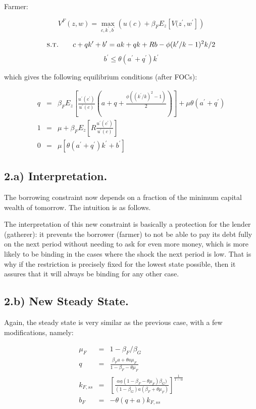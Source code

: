 \documentclass{article}
\begin{document}
Farmer:

$$ V^F(z,w) = \max_{c,k^{\prime},b^{\prime} } \left( u(c) + \beta_F E_z \left[ V(z^{\prime},w^{\prime} \right]  \right) $$

$$ \textsc{s.t.} \quad \quad c+qk^\prime+b^\prime = ak + qk +Rb - \phi(k^\prime/k - 1)^2k/2$$
$$b^\prime \leq \theta \left( a^\prime + q^\prime \right)k^\prime $$

which gives the following equilibrium conditions (after FOCs):

\begin{eqnarray*}
 q & = & \beta_F E_z\left[ \frac{u^\prime(c^\prime)}{u^\prime(c)}(a+q+\frac{\phi((k^\prime/k)^2 -1)}{2})\right]+\mu \theta (a^\prime + q^\prime)\\
 1 & = & \mu + \beta_F E_z\left[R\frac{u^\prime(c^\prime)}{u^\prime(c)}\right] \\
 0 & = & \mu \left[\theta (a^\prime + q^\prime) k^\prime + b^\prime\right] 
\end{eqnarray*}


\subsection*{2.a) Interpretation.}

The borrowing constraint now depends on a fraction of the minimum capital wealth of tomorrow. The intuition is as follows.

The interpretation of this new constraint is basically a protection for the lender (gatherer): it prevents the borrower (farmer) to not be able to pay its debt fully on the next period without needing to ask for even more money, which is more likely to be binding in the cases where the shock the next period is low. That is why if the restriction is precisely fixed for the lowest state possible, then it assures that it will always be binding for any other case.
    

\subsection*{2.b) New Steady State.}

Again, the steady state is very similar as the previous case, with a few modifications, namely:

\begin{eqnarray*}
  \mu_F & = & 1-\beta_F/\beta_G  \\
  q & = & \frac{\beta_F a + \theta a\mu_F}{1-\beta_F - \theta\mu_F}   \\
  k_{F,ss} & = & \left[ \frac{\alpha \underline{a}(1-\beta_F - \theta\mu_F)\beta_G)}{(1-\beta_G) a (\beta_F + \theta \mu_F)} \right]^{\frac{1}{1-\alpha}}  \\
  b_F & = & -\theta(q + a) k_{F,ss}
\end{eqnarray*}
\end{document}
